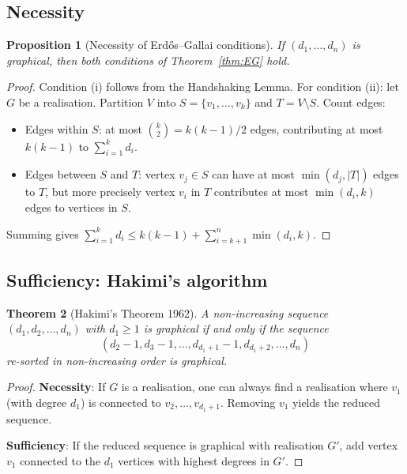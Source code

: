 \documentclass[12pt,a4paper]{amsart}
\newtheorem{theorem}{Theorem}[section]
\newtheorem{proposition}[theorem]{Proposition}
\theoremstyle{definition}
\theoremstyle{remark}
\begin{document}
\subsection{Necessity}

\begin{proposition}[Necessity of Erd\H{o}s--Gallai conditions]
If $(d_1, \ldots, d_n)$ is graphical, then both conditions of
Theorem~\ref{thm:EG} hold.
\end{proposition}

\begin{proof}
Condition (i) follows from the Handshaking Lemma.
For condition (ii): let $G$ be a realisation.
Partition $V$ into $S = \{v_1, \ldots, v_k\}$ and $T = V \setminus S$.
Count edges:
\begin{itemize}[nosep]
  \item Edges within $S$: at most $\binom{k}{2} = k(k-1)/2$ edges, contributing
        at most $k(k-1)$ to $\sum_{i=1}^k d_i$.
  \item Edges between $S$ and $T$: vertex $v_j \in S$ can have at most
        $\min(d_j, |T|)$ edges to $T$, but more precisely vertex $v_i$ in $T$
        contributes at most $\min(d_i, k)$ edges to vertices in $S$.
\end{itemize}
Summing gives $\sum_{i=1}^k d_i \leq k(k-1) + \sum_{i=k+1}^n \min(d_i, k)$.
\end{proof}

\subsection{Sufficiency: Hakimi's algorithm}

\begin{theorem}[Hakimi's Theorem 1962]
\label{thm:hakimi}
A non-increasing sequence $(d_1, d_2, \ldots, d_n)$ with $d_1 \geq 1$ is
graphical if and only if the sequence
\[
  (d_2 - 1, d_3 - 1, \ldots, d_{d_1+1} - 1, d_{d_1+2}, \ldots, d_n)
\]
re-sorted in non-increasing order is graphical.
\end{theorem}

\begin{proof}
\textbf{Necessity}: If $G$ is a realisation, one can always find a realisation
where $v_1$ (with degree $d_1$) is connected to $v_2, \ldots, v_{d_1+1}$.
Removing $v_1$ yields the reduced sequence.

\textbf{Sufficiency}: If the reduced sequence is graphical with realisation $G'$,
add vertex $v_1$ connected to the $d_1$ vertices with highest degrees in $G'$.
\end{proof}
\end{document}
